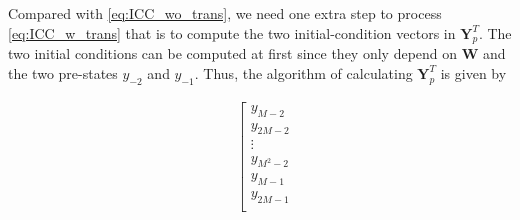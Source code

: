 Compared with \eqref{eq:ICC_wo_trans}, we need one extra step to process \eqref{eq:ICC_w_trans} 
that is to compute the two initial-condition vectors in $\bm{Y}_p^T$. The two initial conditions
can be computed at first since they only depend on $\bm{W}$ and the two pre-states $y_{-2}$ and $y_{-1}$.
Thus, the algorithm of calculating $\bm{Y}_p^T$ is given by

\begin{equation}
    \label{eq:ICC_init_w_trans}
    \begin{aligned}
        &\left[\begin{array}{c}
            y_{M-2}  \\ 
            y_{2M-2}  \\
            \vdots \\
            y_{M^2-2} \\ \hline 
            y_{M-1}  \\ 
            y_{2M-1}  \\

\end{array}
\end{aligned}
\end{equation}
